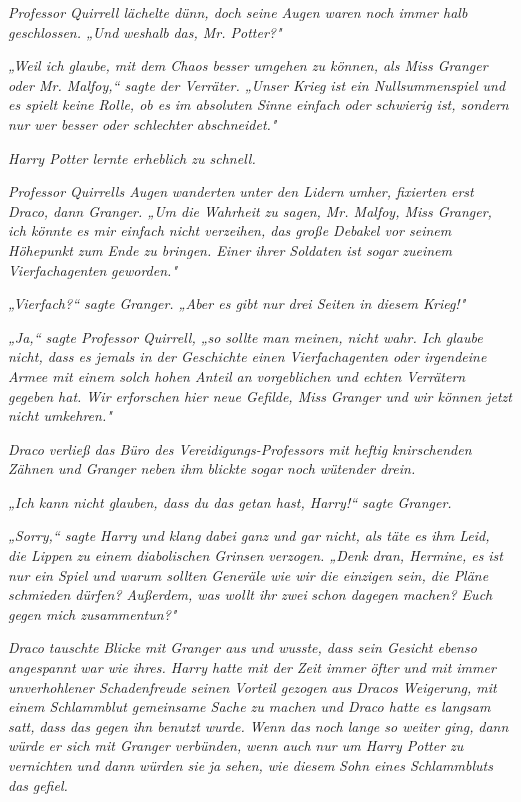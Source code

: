 {\emph{Professor Quirrell lächelte dünn, doch seine Augen waren noch immer halb geschlossen. „Und} \emph{weshalb} \emph{das, Mr. Potter?"}

\emph{„Weil ich glaube, mit dem Chaos besser umgehen zu können, als Miss Granger oder Mr. Malfoy,“ sagte der Verräter. „Unser Krieg ist ein Nullsummenspiel und es spielt keine Rolle, ob es} \emph{im absoluten Sinne} \emph{einfach oder schwierig ist, sondern nur wer besser oder schlechter} \emph{abschneidet."}

\emph{Harry Potter lernte erheblich zu schnell.}

\emph{Professor Quirrells Augen} \emph{wanderten} \emph{unter den Lidern} \emph{umher, fixierten erst Draco, dann Granger. „Um die Wahrheit zu sagen, Mr. Malfoy, Miss Granger, ich könnte es mir einfach nicht verzeihen, das große Debakel vor seinem Höhepunkt zum Ende zu bringen. Einer ihrer Soldaten ist sogar} \emph{zueinem} \emph{Vierfachagenten} \emph{geworden."}

\emph{„\emph{Vierfach?}“ sagte Granger. „Aber es gibt nur drei Seiten in diesem Krieg!"}

\emph{„Ja,“ sagte Professor Quirrell, „so} \emph{sollte man meinen, nicht wahr. Ich glaube nicht, dass es jemals in der Geschichte einen Vierfachagenten oder irgendeine Armee mit einem solch hohen Anteil an vorgeblichen und echten Verrätern gegeben hat. Wir erforschen hier neue Gefilde, Miss} \emph{Granger und wir können jetzt nicht umkehren."}

\emph{Draco verließ das Büro des Vereidigungs-Professors mit heftig} \emph{knirschenden} \emph{Zähnen und Granger neben ihm} \emph{blickte} \emph{sogar noch} \emph{wütender drein.}

\emph{„Ich kann nicht glauben, dass du das getan hast, Harry!“ sagte Granger.}

\emph{„Sorry,“ sagte Harry und klang} \emph{dabei ganz und gar nicht, als täte es ihm Leid, die Lippen} \emph{zu einem diabolischen Grinsen verzogen. „Denk dran, Hermine, es} \emph{\emph{ist}} \emph{nur ein Spiel und warum sollten Generäle wie wir die einzigen sein, die Pläne schmieden dürfen? Außerdem, was wollt ihr} \emph{zwei} \emph{schon dagegen machen? Euch gegen mich zusammentun?"}

\emph{Draco tauschte} \emph{Blicke} \emph{mit Granger aus und wusste, dass sein Gesicht ebenso} \emph{angespannt} \emph{war wie ihres. Harry hatte mit der Zeit immer} \emph{öfter} \emph{und mit immer unverhohlener Schadenfreude} \emph{seinen Vorteil gezogen} \emph{aus} \emph{Dracos Weigerung, mit einem Schlammblut gemeinsame Sache zu machen und Draco hatte es langsam} \emph{\emph{satt,}} \emph{dass das gegen ihn benutzt wurde. Wenn das noch lange so weiter ging,} \emph{dann} \emph{würde er sich mit Granger verbünden,} \emph{wenn auch} \emph{nur um Harry Potter zu vernichten und dann würden sie} \emph{ja} \emph{sehen, wie diesem} \emph{Sohn eines Schlammbluts} \emph{\emph{das}} \emph{gefiel.}

}
